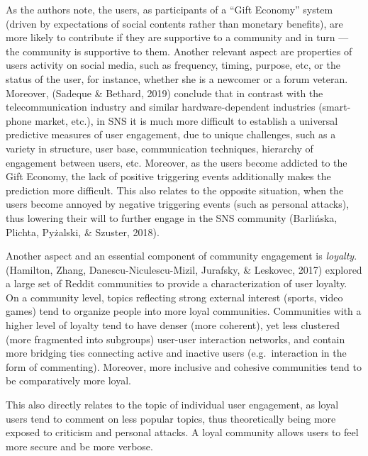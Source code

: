 \documentclass[
  10pt,
  dvipsnames]{scrartcl}
\begin{document}
As the authors note, the users, as participants of a ``Gift Economy''
system (driven by expectations of social contents rather than monetary
benefits), are more likely to contribute if they are supportive to a
community and in turn --- the community is supportive to them. Another
relevant aspect are properties of users activity on social media, such
as frequency, timing, purpose, etc, or the status of the user, for
instance, whether she is a newcomer or a forum veteran. Moreover,
(Sadeque \& Bethard, 2019) conclude that in contrast with the
telecommunication industry and similar hardware-dependent industries
(smart-phone market, etc.), in SNS it is much more difficult to
establish a universal predictive measures of user engagement, due to
unique challenges, such as a variety in structure, user base,
communication techniques, hierarchy of engagement between users, etc.
Moreover, as the users become addicted to the Gift Economy, the lack of
positive triggering events additionally makes the prediction more
difficult. This also relates to the opposite situation, when the users
become annoyed by negative triggering events (such as personal attacks),
thus lowering their will to further engage in the SNS community
(Barlińska, Plichta, Pyżalski, \& Szuster, 2018).

Another aspect and an essential component of community engagement is
\textit{loyalty}. (Hamilton, Zhang, Danescu-Niculescu-Mizil, Jurafsky,
\& Leskovec, 2017) explored a large set of Reddit communities to provide
a characterization of user loyalty. On a community level, topics
reflecting strong external interest (sports, video games) tend to
organize people into more loyal communities. Communities with a higher
level of loyalty tend to have denser (more coherent), yet less clustered
(more fragmented into subgroups) user-user interaction networks, and
contain more bridging ties connecting active and inactive users
(e.g.~interaction in the form of commenting). Moreover, more inclusive
and cohesive communities tend to be comparatively more loyal.

This also directly relates to the topic of individual user engagement,
as loyal users tend to comment on less popular topics, thus
theoretically being more exposed to criticism and personal attacks. A
loyal community allows users to feel more secure and be more verbose.
\end{document}

